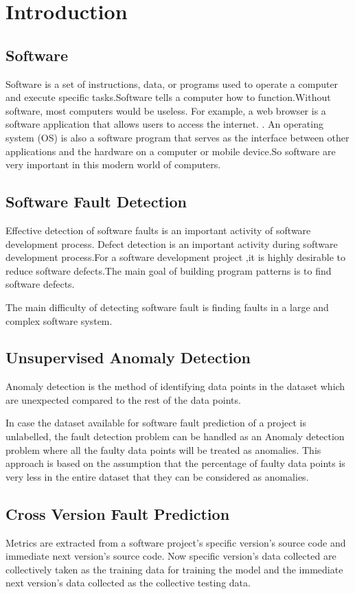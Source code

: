 \chapter{Introduction}\label{chap1}
\section{Software}
Software is a set of instructions, data, or programs used to operate a computer and execute specific tasks.Software tells a computer how to function.Without software, most computers would be useless. For example, a web browser is a software application that allows users to access the internet. . An operating system (OS) is also  a software program that serves as the interface between other applications and the hardware on a computer or mobile device.So software are very important in this modern world of computers.

\section{Software Fault Detection }
Effective detection of software faults is an important activity of software development process. Defect detection is an important activity during software development process.For a software development  project ,it is  highly desirable to reduce software defects.The main goal of building program patterns is to find software defects.\cite{software}

The main difficulty of detecting software fault is finding faults in a large and complex software system. 

\section{Unsupervised Anomaly Detection}
Anomaly detection is the method of identifying data points in the dataset which are unexpected compared to the rest of the data points.

  In case the dataset available for software fault prediction of a project is unlabelled, the fault detection problem can be handled as an Anomaly detection problem where all the faulty data points will be treated as anomalies. This approach is based on the assumption that the percentage of faulty data points is very less in the entire dataset that they can be considered as anomalies.
  
\section{Cross Version Fault Prediction}
  Metrics are extracted from a software project's specific version's source code and immediate next version's source code. Now specific version's data collected are collectively taken as the training data for training the model and the immediate next version's data collected as the collective testing data.


